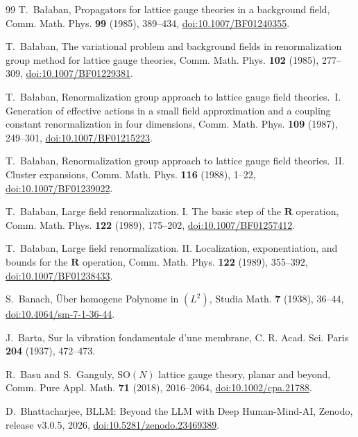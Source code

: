 \documentclass[aps,prd,twocolumn,superscriptaddress,nofootinbib,longbibliography,floatfix,amsmath,amssymb,10pt]{revtex4-2}
\theoremstyle{definition}
\theoremstyle{remark}
\newcommand{\SO}{\mathrm{SO}}
\begin{document}
\begin{thebibliography}{99}
T.~Ba{\l}aban, Propagators for lattice gauge theories in a background
field, Comm. Math. Phys. \textbf{99} (1985), 389--434,
\href{https://doi.org/10.1007/BF01240355}{doi:10.1007/BF01240355}.

T.~Ba{\l}aban, The variational problem and background fields in
renormalization group method for lattice gauge theories, Comm. Math. Phys.
\textbf{102} (1985), 277--309,
\href{https://doi.org/10.1007/BF01229381}{doi:10.1007/BF01229381}.

T.~Ba{\l}aban, Renormalization group approach to lattice gauge field
theories.~I. Generation of effective actions in a small field approximation
and a coupling constant renormalization in four dimensions, Comm. Math.
Phys. \textbf{109} (1987), 249--301,
\href{https://doi.org/10.1007/BF01215223}{doi:10.1007/BF01215223}.

T.~Ba{\l}aban, Renormalization group approach to lattice gauge field
theories.~II. Cluster expansions, Comm. Math. Phys. \textbf{116} (1988),
1--22,
\href{https://doi.org/10.1007/BF01239022}{doi:10.1007/BF01239022}.

T.~Ba{\l}aban, Large field renormalization. I. The basic step of the
$\mathbf R$ operation, Comm. Math. Phys. \textbf{122} (1989), 175--202,
\href{https://doi.org/10.1007/BF01257412}{doi:10.1007/BF01257412}.

T.~Ba{\l}aban, Large field renormalization. II. Localization,
exponentiation, and bounds for the $\mathbf R$ operation, Comm. Math. Phys.
\textbf{122} (1989), 355--392,
\href{https://doi.org/10.1007/BF01238433}{doi:10.1007/BF01238433}.

S.~Banach, \"Uber homogene Polynome in $(L^2)$, Studia Math. \textbf{7}
(1938), 36--44,
\href{https://doi.org/10.4064/sm-7-1-36-44}{doi:10.4064/sm-7-1-36-44}.

J.~Barta, Sur la vibration fondamentale d'une membrane, C. R. Acad. Sci. Paris \textbf{204} (1937), 472--473.

R.~Basu and S.~Ganguly, $\SO(N)$ lattice gauge theory, planar and beyond, Comm. Pure Appl. Math. \textbf{71} (2018), 2016--2064, \href{https://doi.org/10.1002/cpa.21788}{doi:10.1002/cpa.21788}.

D.~Bhattacharjee, BLLM: Beyond the LLM with Deep Human-Mind-AI, Zenodo,
release v3.0.5, 2026,
\href{https://doi.org/10.5281/zenodo.23469389}{doi:10.5281/zenodo.23469389}.


\end{thebibliography}
\end{document}
